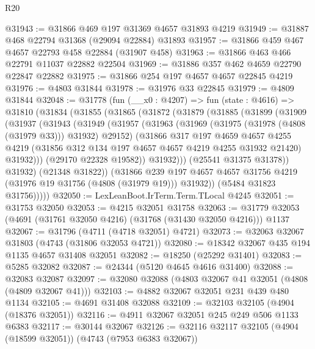 \begin{lexlean}{R20}
\begin{coremodule}
@31943 := @31866 @469 @197 @31369 @4657 @31893 @4219
@31949 := @31887 @468 @22794 @31368 (@29094 @22884) @31893
@31957 := @31866 @459 @467 @4657 @22793 @458 @22884 (@31907 @458)
@31963 := @31866 @463 @466 @22791 @11037 @22882 @22504
@31969 := @31886 @357 @462 @4659 @22790 @22847 @22882
@31975 := @31866 @254 @197 @4657 @4657 @22845 @4219
@31976 := @4803 @31844
@31978 := @31976 @33 @22845
@31979 := @4809 @31844
@32048 := @31778
    (fun (__x0 : @4207) =>
    fun (state : @4616) =>
    @31810
      (@31834
        (@31855
          (@31865
            (@31872
              (@31879
                (@31885
                  (@31899
                    (@31909
                      (@31937
                        (@31943
                          (@31949
                            (@31957
                              (@31963
                                (@31969 (@31975 (@31978 (@4808 (@31979 @33))) @31932) @29152)
                                (@31866
                                  @317
                                  @197
                                  @4659
                                  @4657
                                  @4255
                                  @4219
                                  (@31856 @312 @134 @197 @4657 @4657 @4219 @4255 @31932 @21420)
                                  @31932)))
                            (@29170 @22328 @19582))
                          @31932)))
                    (@25541 @31375 @31378))
                  @31932)
                (@21348 @31822))
              (@31866
                @239
                @197
                @4657
                @4657
                @31756
                @4219
                (@31976 @19 @31756 (@4808 (@31979 @19)))
                @31932))
            (@5484 @31823 @31756)))))
@32050 := LexLeanBoot.IrTerm.Term.TLocal @4245
@32051 := @31753 @32050
@32053 := @4215 @32051 @31758
@32063 := @31779 @32053 (@4691 (@31761 @32050 @4216) (@31768 (@31430 @32050 @4216))) @1137
@32067 := @31796 (@4711 (@4718 @32051) @4721)
@32073 := @32063 @32067 @31803 (@4743 (@31806 @32053 @4721))
@32080 := @18342 @32067 @435 @194 @1135 @4657 @31408 @32051
@32082 := @18250 (@25292 @31401)
@32083 := @5285 @32082
@32087 := @24344 (@5120 @4645 @4616 @31400)
@32088 := @32083 @32087
@32097 := @32080 @32088 (@4803 @32067 @41 @32051 (@4808 (@4809 @32067 @41)))
@32103 := @4882 @32067 @32051 @231 @439 @480 @1134
@32105 := @4691 @31408 @32088
@32109 := @32103 @32105 (@4904 (@18376 @32051))
@32116 := @4911 @32067 @32051 @245 @249 @506 @1133 @6383
@32117 := @30144 @32067
@32126 := @32116 @32117 @32105 (@4904 (@18599 @32051)) (@4743 (@7953 @6383 @32067))

\end{coremodule}
\end{lexlean}
